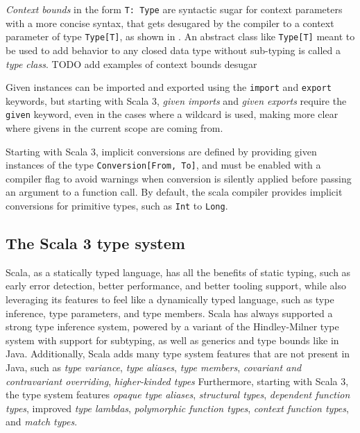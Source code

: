 \textit{Context bounds} in the form \texttt{T: Type} are syntactic sugar for context parameters with a more concise syntax, that gets desugared by the compiler to a context parameter of type \texttt{Type[T]}, as shown in .
%
An abstract class like \texttt{Type[T]} meant to be used to add behavior to any closed data type without sub-typing is called a \textit{type class}.
TODO add examples of context bounds desugar

Given instances can be imported and exported using the \texttt{import} and \texttt{export} keywords, but starting with Scala 3, \textit{given imports} and \textit{given exports} require the \texttt{given} keyword, even in the cases where a wildcard is used, making more clear where givens in the current scope are coming from.

Starting with Scala 3, implicit conversions are defined by providing given instances of the type \texttt{Conversion[From, To]}, and must be enabled with a compiler flag to avoid warnings when conversion is silently applied before passing an argument to a function call.
%
By default, the scala compiler provides implicit conversions for primitive types, such as \texttt{Int} to \texttt{Long}.


\subsection{The Scala 3 type system} \label{chap:background->sec:scala3->subsec:type-system}

Scala, as a statically typed language, has all the benefits of static typing, such as early error detection, better performance, and better tooling support, while also leveraging its features to feel like a dynamically typed language, such as type inference, type parameters, and type members.
%
Scala has always supported a strong type inference system, powered by a variant of the Hindley-Milner type system with support for subtyping, as well as generics and type bounds like in Java.
%
Additionally, Scala adds many type system features that are not present in Java, such as \textit{type variance}, \textit{type aliases}, \textit{type members}, \textit{covariant and contravariant overriding}, \textit{higher-kinded types}
%
Furthermore, starting with Scala 3, the type system features \textit{opaque type aliases}, \textit{structural types}, \textit{dependent function types}, improved \textit{type lambdas}, \textit{polymorphic function types}, \textit{context function types}, and \textit{match types}.

